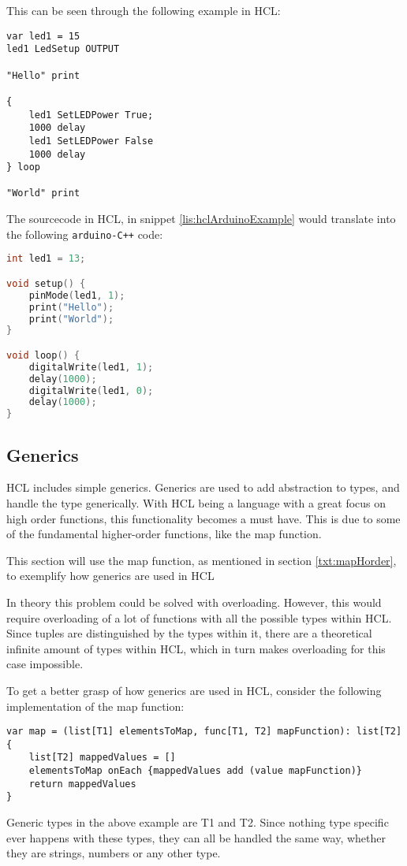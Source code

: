 This can be seen through the following example in HCL:
\begin{lstlisting}[language=HCL,caption={Example of an arduino program in HCL},label={lis:hclArduinoExample},firstnumber=1]
var led1 = 15 
led1 LedSetup OUTPUT 

"Hello" print

{
	led1 SetLEDPower True;
	1000 delay
	led1 SetLEDPower False
	1000 delay
} loop

"World" print 
\end{lstlisting}
The sourcecode in HCL, in snippet \ref{lis:hclArduinoExample} would translate into the following \texttt{arduino-C++} code:
\begin{lstlisting}[language=C,label={lis:cppArduinoExample},firstnumber=1]
int led1 = 13;

void setup() {
	pinMode(led1, 1);
	print("Hello");
	print("World");
}

void loop() {
	digitalWrite(led1, 1);
	delay(1000);
	digitalWrite(led1, 0);
	delay(1000);
} 
\end{lstlisting}

\subsection{Generics}
HCL includes simple generics.
Generics are used to add abstraction to types, and handle the type generically.
With HCL being a language with a great focus on high order functions, this functionality becomes a must have.
This is due to some of the fundamental higher-order functions, like the map function.

This section will use the map function, as mentioned in section \ref{txt:mapHorder}, to exemplify how generics are used in HCL

In theory this problem could be solved with overloading. 
However, this would require overloading of a lot of functions with all the possible types within HCL. 
Since tuples are distinguished by the types within it, there are a theoretical infinite amount of types within HCL, which in turn makes overloading for this case impossible.

To get a better grasp of how generics are used in HCL, consider the following implementation of the map function:
\begin{lstlisting}[language=HCL,label=lis:hclMapping,firstnumber=1]
var map = (list[T1] elementsToMap, func[T1, T2] mapFunction): list[T2] {
	list[T2] mappedValues = []
	elementsToMap onEach {mappedValues add (value mapFunction)}
	return mappedValues
}
\end{lstlisting}

Generic types in the above example are T1 and T2. 
Since nothing type specific ever happens with these types, they can all be handled the same way, whether they are strings, numbers or any other type.
